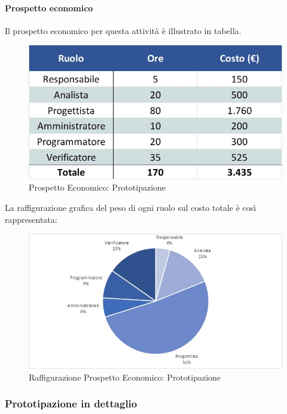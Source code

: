 \paragraph{Prospetto economico}
Il prospetto economico per questa attività è illustrato in tabella. 
\begin{figure}[h!]
	\centerline{\includegraphics[scale=0.4]{img/Preventivo/PrototipazioneEconomico.jpg}}
	\caption{Prospetto Economico: Prototipazione}
\end{figure}
La raffigurazione grafica del peso di ogni ruolo sul costo totale è così rappresentata: 
\begin{figure}[h!]
	\centerline{\includegraphics[scale=0.4]{img/Preventivo/Torte/Prototipazione.jpg}}
	\caption{Raffigurazione Prospetto Economico: Prototipazione}
\end{figure}

\subsubsection{Prototipazione in dettaglio}
